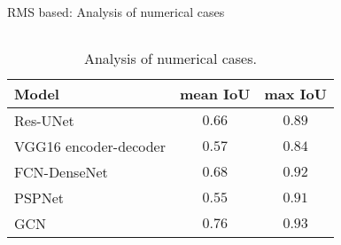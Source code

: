 \documentclass[10pt,aspectratio=169,dvipsnames]{beamer} %
\begin{document}
\begin{frame}{RMS based: Analysis of numerical cases}
\begin{columns}[T]
		\begin{column}[c]{0.9\textwidth}
			\begin{table}[ht!]
				\centering
				\caption{Analysis of numerical cases.}
				\label{tab:table_all_numerical_cases}	
				\begin{tabular}{lcc}
					\toprule[1.5pt]
					Model & mean IoU & max IoU \\ 
					\midrule 
					Res-UNet & \(0.66\) & \(0.89\) \\ 
					VGG16 encoder-decoder & \(0.57\) & \(0.84\) \\ 
					FCN-DenseNet & \(0.68\) & \(0.92\) \\ 
					PSPNet & \(0.55\) & \(0.91\) \\ 
					GCN & \textbf{\(0.76\)} & \textbf{\(0.93\)} \\ 
					\bottomrule[1.5pt]
				\end{tabular}
			\end{table}
		\end{column}
		\end{columns}
	\end{frame}
\end{document}
